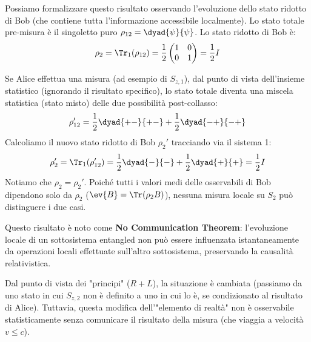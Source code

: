 Possiamo formalizzare questo risultato osservando l'evoluzione dello stato ridotto di Bob (che contiene tutta l'informazione accessibile localmente).
Lo stato totale pre-misura è il singoletto puro $\rho_{12} = \dyad{\psi}{\psi}$.
Lo stato ridotto di Bob è:
\[
    \rho_2 = \Tr_1(\rho_{12}) = \frac{1}{2} \begin{pmatrix} 1 & 0 \\ 0 & 1 \end{pmatrix} = \frac{1}{2} I
\]

Se Alice effettua una misura (ad esempio di $S_{z,1}$), dal punto di vista dell'insieme statistico (ignorando il risultato specifico), lo stato totale diventa una miscela statistica (stato misto) delle due possibilità post-collasso:
\[
    \rho_{12}' = \frac{1}{2} \dyad{+-}{+-} + \frac{1}{2} \dyad{-+}{-+}
\]
Calcoliamo il nuovo stato ridotto di Bob $\rho_2'$ tracciando via il sistema 1:
\[
    \rho_2' = \Tr_1(\rho_{12}') = \frac{1}{2} \dyad{-}{-} + \frac{1}{2} \dyad{+}{+} = \frac{1}{2} I
\]
Notiamo che $\rho_2 = \rho_2'$. Poiché tutti i valori medi delle osservabili di Bob dipendono solo da $\rho_2$ ($\ev{B} = \Tr(\rho_2 B)$), nessuna misura locale su $S_2$ può distinguere i due casi.

Questo risultato è noto come \textbf{No Communication Theorem}: l'evoluzione locale di un sottosistema entangled non può essere influenzata istantaneamente da operazioni locali effettuate sull'altro sottosistema, preservando la causalità relativistica.

\begin{remark}
    Dal punto di vista dei "principi" ($R+L$), la situazione è cambiata (passiamo da uno stato in cui $S_{z,2}$ non è definito a uno in cui lo è, se condizionato al risultato di Alice). Tuttavia, questa modifica dell'"elemento di realtà" non è osservabile statisticamente senza comunicare il risultato della misura (che viaggia a velocità $v \le c$).
\end{remark}


